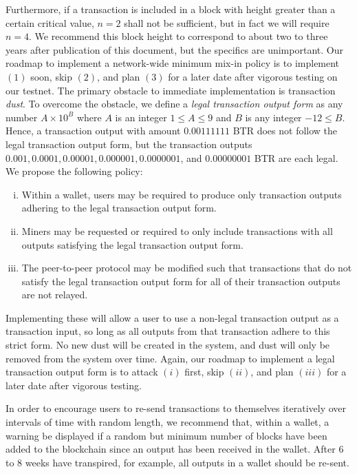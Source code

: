 \documentclass[12pt,english]{mrl}
\theoremstyle{definition}
\renewcommand{\leq}{\leqslant}
\numberwithin{equation}{section}
\numberwithin{figure}{section}
\numberwithin{equation}{section}
\numberwithin{equation}{section}
\numberwithin{figure}{section}
\begin{document}
Furthermore, if a transaction is included in a block with height greater than a certain critical value, $n=2$ shall not be sufficient, but in fact we will require $n=4$. We recommend this block height to correspond to about two to three years after publication of this document, but the specifics are unimportant.  Our roadmap to implement a network-wide minimum mix-in policy is to implement $(1)$ soon, skip $(2)$, and plan $(3)$ for a later date after vigorous testing on our testnet. The primary obstacle to immediate implementation is transaction \textit{dust}. To overcome the obstacle, we define a \textit{legal transaction output form} as any number $A \times 10^{B}$ where $A$ is an integer $1 \leq A \leq 9$ and $B$ is any integer $-12 \leq B$. Hence, a transaction output with amount $0.00111111$ BTR does not follow the legal transaction output form, but the transaction outputs $0.001, 0.0001, 0.00001, 0.000001, 0.0000001$, and $0.00000001$ BTR are each legal. We propose the following policy:

\begin{enumerate}[(i)]
\item Within a wallet, users may be required to produce only transaction outputs adhering to the legal transaction output form.
\item Miners may be requested or required to only include transactions with all outputs satisfying the legal transaction output form.
\item The peer-to-peer protocol may be modified such that transactions that do not satisfy the legal transaction output form for all of their transaction outputs are not relayed.
\end{enumerate}

Implementing these will allow a user to use a non-legal transaction output as a transaction input, so long as all outputs from that transaction adhere to this strict form. No new dust will be created in the system, and dust will only be removed from the system over time. Again, our roadmap to implement a legal transaction output form is to attack $(i)$ first, skip $(ii)$, and plan $(iii)$ for a later date after vigorous testing. 

In order to encourage users to re-send transactions to themselves iteratively over intervals of time with random length, we recommend that, within a wallet, a warning be displayed if a random but minimum number of blocks have been added to the blockchain since an output has been received in the wallet. After $6$ to $8$ weeks have transpired, for example, all outputs in a wallet should be re-sent.
\end{document}
